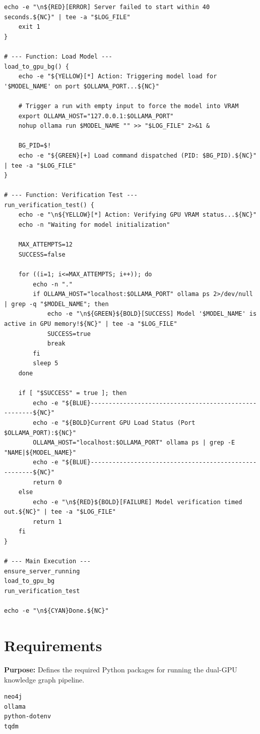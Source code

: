 \documentclass[11pt]{article}
\begin{document}
\begin{lstlisting}[style=bashcode, caption={load\_model\_gpu\_1.sh}]
    echo -e "\n${RED}[ERROR] Server failed to start within 40 seconds.${NC}" | tee -a "$LOG_FILE"
    exit 1
}

# --- Function: Load Model ---
load_to_gpu_bg() {
    echo -e "${YELLOW}[*] Action: Triggering model load for '$MODEL_NAME' on port $OLLAMA_PORT...${NC}"
    
    # Trigger a run with empty input to force the model into VRAM
    export OLLAMA_HOST="127.0.0.1:$OLLAMA_PORT"
    nohup ollama run $MODEL_NAME "" >> "$LOG_FILE" 2>&1 &
    
    BG_PID=$!
    echo -e "${GREEN}[+] Load command dispatched (PID: $BG_PID).${NC}" | tee -a "$LOG_FILE"
}

# --- Function: Verification Test ---
run_verification_test() {
    echo -e "\n${YELLOW}[*] Action: Verifying GPU VRAM status...${NC}"
    echo -n "Waiting for model initialization"
    
    MAX_ATTEMPTS=12
    SUCCESS=false
    
    for ((i=1; i<=MAX_ATTEMPTS; i++)); do
        echo -n "."
        if OLLAMA_HOST="localhost:$OLLAMA_PORT" ollama ps 2>/dev/null | grep -q "$MODEL_NAME"; then
            echo -e "\n${GREEN}${BOLD}[SUCCESS] Model '$MODEL_NAME' is active in GPU memory!${NC}" | tee -a "$LOG_FILE"
            SUCCESS=true
            break
        fi
        sleep 5
    done

    if [ "$SUCCESS" = true ]; then
        echo -e "${BLUE}------------------------------------------------------${NC}"
        echo -e "${BOLD}Current GPU Load Status (Port $OLLAMA_PORT):${NC}"
        OLLAMA_HOST="localhost:$OLLAMA_PORT" ollama ps | grep -E "NAME|${MODEL_NAME}"
        echo -e "${BLUE}------------------------------------------------------${NC}"
        return 0
    else
        echo -e "\n${RED}${BOLD}[FAILURE] Model verification timed out.${NC}" | tee -a "$LOG_FILE"
        return 1
    fi
}

# --- Main Execution ---
ensure_server_running
load_to_gpu_bg
run_verification_test

echo -e "\n${CYAN}Done.${NC}"
\end{lstlisting}

\section{Requirements} \label{sec:requirements}
\textbf{Purpose:} Defines the required Python packages for running the dual-GPU knowledge graph pipeline.

\begin{lstlisting}[style=bashcode, caption={requirements.txt}]
neo4j
ollama
python-dotenv
tqdm
\end{lstlisting}
\end{document}

